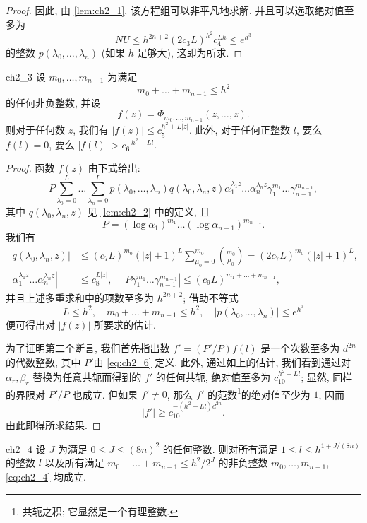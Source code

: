 \begin{proof}
因此, 由 \autoref{lem:ch2_1}, 该方程组可以非平凡地求解, 并且可以选取绝对值至多为
\[
NU \le h^{2n+2} (2c_3 L)^{h^2} c_4^{Lh} \le e^{h^3}
\]
的整数 $p(\lambda_0, \dots, \lambda_n)$ (如果 $h$ 足够大), 这即为所求.
\end{proof}

\begin{mylemma}{}{ch2_3}
设 $m_0, \dots, m_{n-1}$ 为满足
\[
m_0 + \dots + m_{n-1} \le h^2
\]
的任何非负整数, 并设
\begin{equation} \label{eq:ch2_7}\tag{7}
f(z) = \Phi_{m_0, \dots, m_{n-1}}(z, \dots, z).
\end{equation}
则对于任何数 $z$, 我们有 $|f(z)| \le c_5^{h^2+L|z|}$. 此外, 对于任何正整数 $l$, 要么 $f(l) = 0$, 要么 $|f(l)| > c_6^{-h^2-Ll}$.
\end{mylemma}

\begin{proof}
函数 $f(z)$ 由下式给出:
\[
P \sum_{\lambda_0=0}^L \dots \sum_{\lambda_n=0}^L p(\lambda_0, \dots, \lambda_n) q(\lambda_0, \lambda_n, z) \alpha_1^{\lambda_1 z} \dots \alpha_n^{\lambda_n z} \gamma_1^{m_1} \dots \gamma_{n-1}^{m_{n-1}},
\]
其中 $q(\lambda_0, \lambda_n, z)$ 见 \autoref{lem:ch2_2} 中的定义, 且
\[
P = (\log \alpha_1)^{m_1} \dots (\log \alpha_{n-1})^{m_{n-1}}.
\]
我们有
\begin{align*}
|q(\lambda_0, \lambda_n, z)| &\le (c_7 L)^{m_0} (|z| + 1)^L \sum_{\mu_0=0}^{m_0} \binom{m_0}{\mu_0} = (2c_7 L)^{m_0} (|z| + 1)^L, \\
\left|\alpha_1^{\lambda_1 z} \dots \alpha_n^{\lambda_n z}\right| &\le c_8^{L|z|}, \quad \left|P \gamma_1^{m_1} \dots \gamma_{n-1}^{m_{n-1}}\right| \le (c_9 L)^{m_1+\dots+m_{n-1}},
\end{align*}
并且上述多重求和中的项数至多为 $h^{2n+2}$; 借助不等式
\[
L \le h^2, \quad m_0 + \dots + m_{n-1} \le h^2, \quad |p(\lambda_0, \dots, \lambda_n)| \le e^{h^3}
\]
便可得出对 $|f(z)|$ 所要求的估计.

为了证明第二个断言, 我们首先指出数 $f' = (P'/P)f(l)$ 是一个次数至多为 $d^{2n}$ 的代数整数, 其中 $P'$由 \eqref{eq:ch2_6} 定义. 此外, 通过如上的估计, 我们看到通过对 $\alpha_r, \beta_r$ 替换为任意共轭而得到的 $f'$ 的任何共轭, 绝对值至多为 $c_{10}^{h^2+Ll}$; 显然, 同样的界限对 $P'/P$ 也成立. 但如果 $f' \neq 0$, 那么 $f'$ 的范数\footnote{共轭之积; 它显然是一个有理整数.}的绝对值至少为 $1$, 因而
\[
|f'| \ge c_{10}^{-(h^2+Ll)d^{2n}}.
\]
由此即得所求结果.
\end{proof}

\begin{mylemma}{}{ch2_4}
设 $J$ 为满足 $0 \le J \le (8n)^2$ 的任何整数. 则对所有满足 $1 \le l \le h^{1+J/(8n)}$ 的整数 $l$ 以及所有满足 $m_0 + \dots + m_{n-1} \le h^2/2^J$ 的非负整数 $m_0, \dots, m_{n-1}$, \eqref{eq:ch2_4} 均成立.
\end{mylemma}

